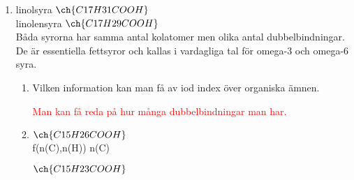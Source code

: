 \documentclass[12pt, letterpaper, twoside]{article}
\begin{document}
\begin{flushleft}
\begin{enumerate}[label=\textbf{\alph*)}]
\begin{enumerate}[label=\textbf{\roman*. }]
\begin{enumerate}[label=\textbf{\arabic*. }]
        \end{enumerate}

        \hfill

    \end{enumerate}

    \item %
    linolsyra
    \textit{$ \ch{C17H31COOH}  $}\\
    linolensyra
    \textit{$ \ch{C17H29COOH}  $}\\
    Båda syrorna har samma antal kolatomer men olika antal dubbelbindningar. De är essentiella fettsyror och kallas
    i vardagliga tal för omega-3 och omega-6 syra.

    \begin{enumerate}[label=\textbf{\roman*. }]
        \item %
        Vilken information kan man få av iod index över organiska ämnen.

        \textcolor{red}{
            Man kan få reda på hur många dubbelbindningar man har.
        }

        \hfill

        \item %
        \textit{$ \ch{C15H26COOH} $}\\

        f(n(C),n(H)){
            n(C)
        }


        \textit{$ \ch{C15H23COOH} $}\\

    \end{enumerate}

\end{enumerate}

\end{flushleft}
\end{document}
